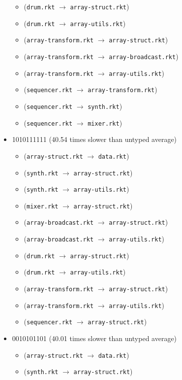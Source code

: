 \documentclass{article}
\newcommand{\mono}[1]{\texttt{#1}}
\begin{document}
\begin{itemize}
\begin{itemize}
  \item (\mono{drum.rkt} $\rightarrow$ \mono{array-struct.rkt})
  \item (\mono{drum.rkt} $\rightarrow$ \mono{array-utils.rkt})
  \item (\mono{array-transform.rkt} $\rightarrow$ \mono{array-struct.rkt})
  \item (\mono{array-transform.rkt} $\rightarrow$ \mono{array-broadcast.rkt})
  \item (\mono{array-transform.rkt} $\rightarrow$ \mono{array-utils.rkt})
  \item (\mono{sequencer.rkt} $\rightarrow$ \mono{array-transform.rkt})
  \item (\mono{sequencer.rkt} $\rightarrow$ \mono{synth.rkt})
  \item (\mono{sequencer.rkt} $\rightarrow$ \mono{mixer.rkt})
  \end{itemize}
\item 1010111111 (40.54 times slower than untyped average)
  \begin{itemize}
  \item (\mono{array-struct.rkt} $\rightarrow$ \mono{data.rkt})
  \item (\mono{synth.rkt} $\rightarrow$ \mono{array-struct.rkt})
  \item (\mono{synth.rkt} $\rightarrow$ \mono{array-utils.rkt})
  \item (\mono{mixer.rkt} $\rightarrow$ \mono{array-struct.rkt})
  \item (\mono{array-broadcast.rkt} $\rightarrow$ \mono{array-struct.rkt})
  \item (\mono{array-broadcast.rkt} $\rightarrow$ \mono{array-utils.rkt})
  \item (\mono{drum.rkt} $\rightarrow$ \mono{array-struct.rkt})
  \item (\mono{drum.rkt} $\rightarrow$ \mono{array-utils.rkt})
  \item (\mono{array-transform.rkt} $\rightarrow$ \mono{array-struct.rkt})
  \item (\mono{array-transform.rkt} $\rightarrow$ \mono{array-utils.rkt})
  \item (\mono{sequencer.rkt} $\rightarrow$ \mono{array-struct.rkt})
  \end{itemize}
\item 0010101101 (40.01 times slower than untyped average)
  \begin{itemize}
  \item (\mono{array-struct.rkt} $\rightarrow$ \mono{data.rkt})
  \item (\mono{synth.rkt} $\rightarrow$ \mono{array-struct.rkt})

\end{itemize}
\end{itemize}
\end{document}
